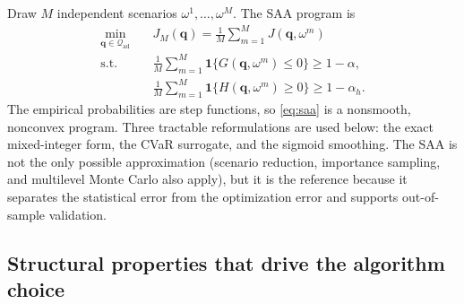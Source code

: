 \documentclass[11pt]{article}
\numberwithin{equation}{section}
\newcommand{\qq}{\mathbf{q}}
\newcommand{\ind}{\mathbf{1}}
\theoremstyle{plain}
\begin{document}
Draw $M$ independent scenarios $\omega^1,\dots,\omega^M$.  The SAA program is
\begin{equation}
\label{eq:saa}
\begin{aligned}
\min_{\qq\in\mathcal{Q}_{\mathrm{ad}}}\quad
& J_M(\qq)=\frac{1}{M}\sum_{m=1}^{M}J(\qq,\omega^m)\\
\text{s.t.}\quad
& \frac{1}{M}\sum_{m=1}^{M}\ind\{G(\qq,\omega^m)\le0\}\ge1-\alpha,\\
& \frac{1}{M}\sum_{m=1}^{M}\ind\{H(\qq,\omega^m)\ge0\}\ge1-\alpha_h.
\end{aligned}
\end{equation}
The empirical probabilities are step functions, so \eqref{eq:saa} is a
nonsmooth, nonconvex program.  Three tractable reformulations are used below:
the exact mixed-integer form, the CVaR surrogate, and the sigmoid smoothing.
The SAA is not the only possible approximation (scenario reduction,
importance sampling, and multilevel Monte Carlo also apply), but it is the
reference because it separates the statistical error from the optimization
error and supports out-of-sample validation.

\subsection{Structural properties that drive the algorithm choice}
\end{document}
